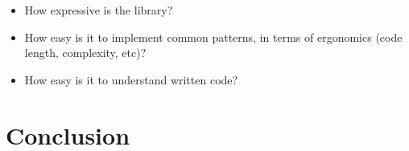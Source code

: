 \documentclass[a4paper]{article}
\begin{document}

\begin{itemize}

\item How expressive is the library?


\item How easy is it to implement common patterns, in terms of ergonomics (code
  length, complexity, etc)?

\item How easy is it to understand written code?
\end{itemize}

\section{Conclusion}
\end{document}
